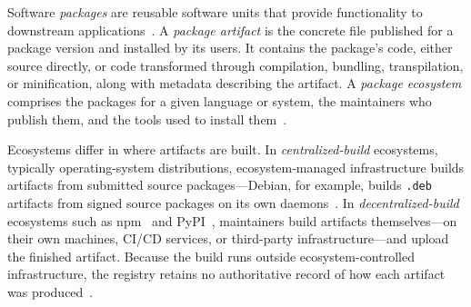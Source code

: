 Software \textit{packages} are reusable software units that provide functionality to downstream applications~\cite{decan_empirical_2019}.
A \emph{package artifact} is the concrete file published for a package version and installed by its users. It contains the package's code, either source directly, or code transformed through compilation, bundling, transpilation, or minification, along with metadata describing the artifact. A \emph{package ecosystem} comprises the packages for a given language or system, the maintainers who publish them, and the tools used to install them~\cite{decan_empirical_2019}.

Ecosystems differ in where artifacts are built. In \emph{centralized-build} ecosystems, typically operating-system distributions, ecosystem-managed infrastructure builds artifacts from submitted source packages---Debian, for example, builds \texttt{.deb} artifacts from signed source packages on its own daemons~\cite{noauthor_debian_nodate}. In \emph{decentralized-build} ecosystems such as npm~\cite{noauthor_npm_nodate} and PyPI~\cite{noauthor_pypi_nodate}, maintainers build artifacts themselves---on their own machines, CI/CD services, or third-party infrastructure---and upload the finished artifact. Because the build runs outside ecosystem-controlled infrastructure, the registry retains no authoritative record of how each artifact was produced~\cite{benedetti_empirical_2025}.


